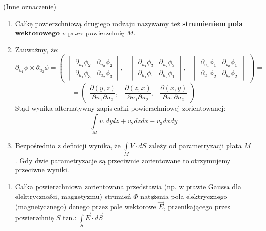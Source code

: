 \begin{uwg}{(Inne oznaczenie)}\\
	\begin{enumerate}[\rm 1.]
		\item
		Całkę powierzchniową drugiego rodzaju nazywamy też \textbf{strumieniem pola wektorowego} $v$
		przez powierzchnię $M$.
		\item
		Zauważmy, że: $$\partial_{u_1}\phi\times\partial_{u_2}\phi=
		\begin{pmatrix}
		\begin{vmatrix}
		\partial_{u_1}\phi_2 & \partial_{u_2}\phi_2\\
		\partial_{u_1}\phi_3 & \partial_{u_2}\phi_3
		\end{vmatrix},
		&
		\begin{vmatrix}
		\partial_{u_1}\phi_3 & \partial_{u_2}\phi_3\\
		\partial_{u_1}\phi_1 & \partial_{u_2}\phi_1
		\end{vmatrix},
		&
		\begin{vmatrix}
		\partial_{u_1}\phi_1 & \partial_{u_2}\phi_1\\
		\partial_{u_1}\phi_2 & \partial_{u_2}\phi_2
		\end{vmatrix}
		\end{pmatrix}=$$
		$$=\begin{pmatrix}
		\dfrac{\partial(y,z)}{\partial u_1\partial u_2}, & \dfrac{\partial(z,x)}{\partial u_1\partial u_2}, & \dfrac{\partial(x,y)}{\partial u_1\partial u_2}
		\end{pmatrix}$$
		Stąd wynika alternatywny zapis całki powierzchniowej zorientowanej: $$\int\limits_Mv_1dydz+v_2dzdx+v_3dxdy$$
		\item
		Bezpośrednio z definicji wynika, że $\int\limits_MV\cdot dS$ zależy od parametryzacji płata $M$. Gdy dwie parametryzacje są przeciwnie zorientowane to otrzymujemy przeciwne wyniki.
	\end{enumerate}
\end{uwg}

\begin{przyk}
	\begin{enumerate}[\rm 1.]
		\item
		Całka powierzchniowa zorientowana przedstawia (np. w prawie Gaussa dla elektryczności, magnetyzmu) strumień $\Phi$ natężenia pola elektrycznego (magnetycznego) danego przez pole wektorowe $\vec{E}$, przenikającego przez powierzchnię $S$ tzn.: $\int\limits_S\vec{E}\cdot d\vec{S}$
	\end{enumerate}
\end{przyk}

